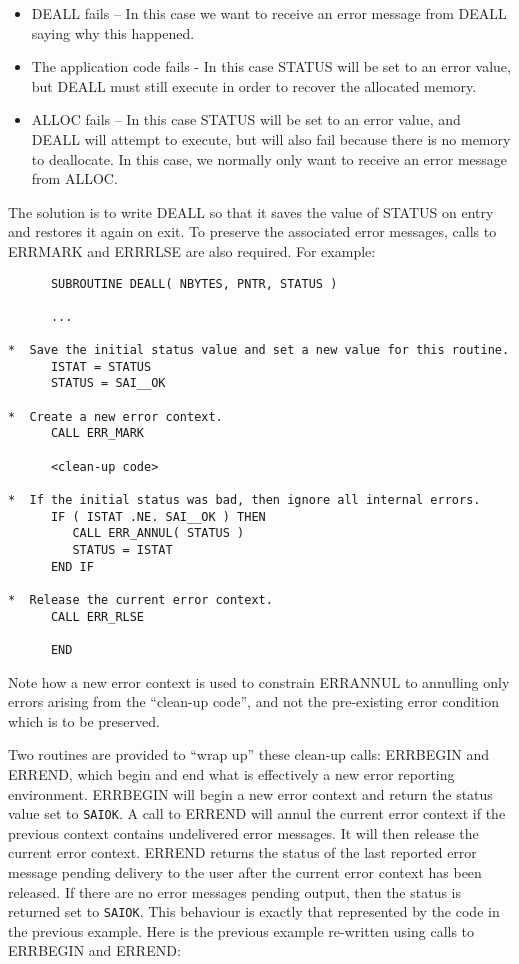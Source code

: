 \documentclass[twoside,11pt]{article}
\renewcommand{\_}{\texttt{\symbol{95}}}
\newcommand{\const}[1]{\texttt{#1}}
\newcommand{\saiok}{\const{SAI\_\_OK}}
\begin{document}
\begin{itemize}
\item DEALL fails -- In this case we want to receive an error message from
DEALL saying why this happened. 

\item The application code fails - In this case STATUS will be set to an
error value, but DEALL must still execute in order to recover the allocated
memory. 

\item ALLOC fails -- In this case STATUS will be set to an error value, and
DEALL will attempt to execute, but will also fail because there is no memory
to deallocate. 
In this case, we normally only want to receive an error message from ALLOC.
\end {itemize}

The solution is to write DEALL so that it saves the value of STATUS on entry
and restores it again on exit. 
To preserve the associated error messages, calls to ERR\_MARK and ERR\_RLSE
are also required. 
For example:


\begin {small}
\begin{verbatim}
      SUBROUTINE DEALL( NBYTES, PNTR, STATUS )

      ...

*  Save the initial status value and set a new value for this routine.
      ISTAT = STATUS
      STATUS = SAI__OK

*  Create a new error context.
      CALL ERR_MARK

      <clean-up code>

*  If the initial status was bad, then ignore all internal errors.
      IF ( ISTAT .NE. SAI__OK ) THEN
         CALL ERR_ANNUL( STATUS )
         STATUS = ISTAT
      END IF

*  Release the current error context.
      CALL ERR_RLSE

      END
\end{verbatim}
\end {small}

Note how a new error context is used to constrain ERR\_ANNUL to annulling
only errors arising from the ``clean-up code'', and not the pre-existing
error condition which is to be preserved. 

Two routines are provided to ``wrap up'' these clean-up calls: ERR\_BEGIN and
ERR\_END, which begin and end what is effectively a new error reporting
environment.
ERR\_BEGIN will begin a new error context and return the 
status value set to \saiok. 
A call to ERR\_END will annul the current error context if the previous
context contains undelivered error messages.
It will then release the current error context.
ERR\_END returns the status of the last reported error message pending
delivery to the user after the current error context has been released.
If there are no error messages pending output, then the status is
returned set to \saiok.
This behaviour is exactly that represented by the code in the previous example.
Here is the previous example re-written using calls to ERR\_BEGIN and
ERR\_END:
\end{document}
